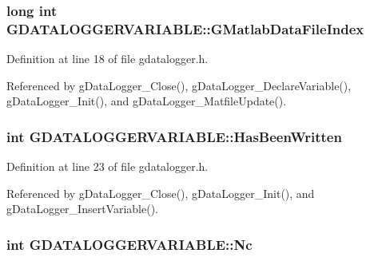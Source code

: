 \hypertarget{structGDATALOGGERVARIABLE_aa1cd5b838d8655734e7d4499b25bf22a}{
\subsubsection[{G\-Matlab\-Data\-File\-Index}]{\setlength{\rightskip}{0pt plus 5cm}long int G\-D\-A\-T\-A\-L\-O\-G\-G\-E\-R\-V\-A\-R\-I\-A\-B\-L\-E\-::\-G\-Matlab\-Data\-File\-Index}}\label{structGDATALOGGERVARIABLE_aa1cd5b838d8655734e7d4499b25bf22a}


Definition at line 18 of file gdatalogger.\-h.



Referenced by g\-Data\-Logger\-\_\-\-Close(), g\-Data\-Logger\-\_\-\-Declare\-Variable(), g\-Data\-Logger\-\_\-\-Init(), and g\-Data\-Logger\-\_\-\-Matfile\-Update().

\hypertarget{structGDATALOGGERVARIABLE_ad982aef10e8496c2a1c6b9bb1f1dc5c3}{
\subsubsection[{Has\-Been\-Written}]{\setlength{\rightskip}{0pt plus 5cm}int G\-D\-A\-T\-A\-L\-O\-G\-G\-E\-R\-V\-A\-R\-I\-A\-B\-L\-E\-::\-Has\-Been\-Written}}\label{structGDATALOGGERVARIABLE_ad982aef10e8496c2a1c6b9bb1f1dc5c3}


Definition at line 23 of file gdatalogger.\-h.



Referenced by g\-Data\-Logger\-\_\-\-Close(), g\-Data\-Logger\-\_\-\-Init(), and g\-Data\-Logger\-\_\-\-Insert\-Variable().

\hypertarget{structGDATALOGGERVARIABLE_abd1db7599f09e121cd125e665cb9c460}{
\subsubsection[{Nc}]{\setlength{\rightskip}{0pt plus 5cm}int G\-D\-A\-T\-A\-L\-O\-G\-G\-E\-R\-V\-A\-R\-I\-A\-B\-L\-E\-::\-Nc}}\label{structGDATALOGGERVARIABLE_abd1db7599f09e121cd125e665cb9c460}



